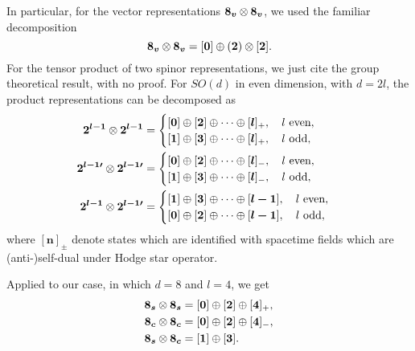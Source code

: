 In particular, for the vector representations $\boldsymbol{8_v} \otimes \boldsymbol{8_v}$, we used the familiar decomposition
\begin{equation}
    \boldsymbol{8_v} \otimes \boldsymbol{8_v} = [\boldsymbol{0}] \oplus (\boldsymbol{2}) \otimes [\boldsymbol{2}].
\end{equation}
For the tensor product of two spinor representations, we just cite the group theoretical result, with no proof. For $SO(d)$ in even dimension, with $d = 2l$, the product representations can be decomposed as
\begin{subequations}
\begin{align}
    \boldsymbol{2^{l-1}} \otimes \boldsymbol{2^{l-1}} &= 
    \begin{cases}
        [\boldsymbol{0}] \oplus [\boldsymbol{2}] \oplus \dots \oplus [\boldsymbol{l}]_+, \quad \textup{$l$ even}, \\
        [\boldsymbol{1}] \oplus [\boldsymbol{3}] \oplus \dots \oplus [\boldsymbol{l}]_+, \quad \textup{$l$ odd}, 
    \end{cases} \\
    \boldsymbol{2^{l-1\prime}} \otimes \boldsymbol{2^{l-1\prime}} &= 
    \begin{cases}
        [\boldsymbol{0}] \oplus [\boldsymbol{2}] \oplus \dots \oplus [\boldsymbol{l}]_-, \quad \textup{$l$ even}, \\
        [\boldsymbol{1}] \oplus [\boldsymbol{3}] \oplus \dots \oplus [\boldsymbol{l}]_-, \quad \textup{$l$ odd}, 
    \end{cases}  \\
    \boldsymbol{2^{l-1}} \otimes \boldsymbol{2^{l-1\prime}} &= 
    \begin{cases}
        [\boldsymbol{1}] \oplus [\boldsymbol{3}] \oplus \dots \oplus [\boldsymbol{l-1}], \quad \textup{$l$ even}, \\
        [\boldsymbol{0}] \oplus [\boldsymbol{2}] \oplus \dots \oplus [\boldsymbol{l-1}], \quad \textup{$l$ odd}, 
    \end{cases} 
\end{align}
\end{subequations}
where $[\boldsymbol{n}]_\pm$ denote states which are identified with spacetime fields which are (anti-)self-dual under Hodge star operator.

Applied to our case, in which $d=8$ and $l=4$, we get
\begin{subequations}
\begin{align}
    \boldsymbol{8_s} \otimes \boldsymbol{8_s} &= [\boldsymbol{0}] \oplus [\boldsymbol{2}] \oplus [\boldsymbol{4}]_+ ,\\
    \boldsymbol{8_c} \otimes \boldsymbol{8_c} &= [\boldsymbol{0}] \oplus [\boldsymbol{2}] \oplus [\boldsymbol{4}]_-, \\
    \boldsymbol{8_s} \otimes \boldsymbol{8_c} &= [\boldsymbol{1}] \oplus [\boldsymbol{3}] .\\
\end{align}
\end{subequations}

